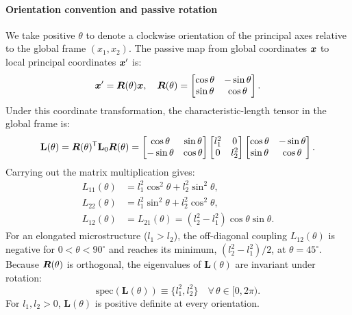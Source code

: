 \paragraph{Orientation convention and passive rotation}
We take positive $\theta$ to denote a clockwise orientation of the principal axes relative to the global frame $(x_1,x_2)$. The passive map from global coordinates $\bm{x}$ to local principal coordinates $\bm{x}'$ is:
\begin{equation}
\bm{x}' = \bm{R}(\theta)\bm{x}, \quad \bm{R}(\theta) = \begin{bmatrix} \cos\theta & -\sin\theta \\ \sin\theta & \cos\theta \end{bmatrix}.
\label{eq:R_matrix}
\end{equation}
Under this coordinate transformation, the characteristic-length tensor in the global frame is:
\begin{equation}
\mathbf{L}(\theta) = \bm{R}(\theta)^\mathsf{T} \mathbf{L}_0 \bm{R}(\theta) = \begin{bmatrix} \cos\theta & \sin\theta \\ -\sin\theta & \cos\theta \end{bmatrix} \begin{bmatrix} l_1^2 & 0 \\ 0 & l_2^2 \end{bmatrix} \begin{bmatrix} \cos\theta & -\sin\theta \\ \sin\theta & \cos\theta \end{bmatrix}.
\label{eq:L_rotation}
\end{equation}
Carrying out the matrix multiplication gives:
\begin{subequations}
\label{eq:L_components}
\begin{align}
L_{11}(\theta) &= l_1^2 \cos^2\theta + l_2^2 \sin^2\theta, \label{eq:L11} \\
L_{22}(\theta) &= l_1^2 \sin^2\theta + l_2^2 \cos^2\theta, \label{eq:L22} \\
L_{12}(\theta) &= L_{21}(\theta) = (l_2^2 - l_1^2)\cos\theta\sin\theta. \label{eq:L12}
\end{align}
\end{subequations}
For an elongated microstructure ($l_1 > l_2$), the off-diagonal coupling $L_{12}(\theta)$ is negative for $0 < \theta < 90^\circ$ and reaches its minimum, $(l_2^2-l_1^2)/2$, at $\theta=45^\circ$. Because $\bm{R}(\theta)$ is orthogonal, the eigenvalues of $\mathbf{L}(\theta)$ are invariant under rotation:
\begin{equation}
\mathrm{spec}(\mathbf{L}(\theta)) \equiv \{l_1^2, l_2^2\} \quad \forall\,\theta \in [0, 2\pi).
\label{eq:eigenvalues_invariant}
\end{equation}
For $l_1,l_2>0$, $\mathbf{L}(\theta)$ is positive definite at every orientation.

